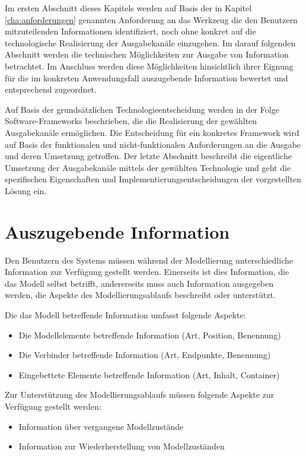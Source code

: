 Im ersten Abschnitt dieses Kapitels werden auf Basis der in Kapitel \ref{cha:anforderungen} genannten Anforderung an das Werkzeug die den Benutzern mitzuteilenden Informationen identifiziert, noch ohne konkret auf die technologische Realisierung der Ausgabekanäle einzugehen. Im darauf folgenden Abschnitt werden die technischen Möglichkeiten zur Ausgabe von Information betrachtet. Im Anschluss werden diese Möglichkeiten hinsichtlich ihrer Eignung für die im konkreten Anwendungsfall auszugebende Information bewertet und entsprechend zugeordnet.

Auf Basis der grundsätzlichen Technologieentscheidung werden in der Folge Software-Frameworks beschrieben, die die Realisierung der gewählten Ausgabekanäle ermöglichen. Die Entscheidung für ein konkretes Framework wird auf Basis der funktionalen und nicht-funktionalen Anforderungen an die Ausgabe und deren Umsetzung getroffen. Der letzte Abschnitt beschreibt die eigentliche Umsetzung der Ausgabekanäle mittels der gewählten Technologie und geht die spezifischen Eigenschaften und Implementierungsentscheidungen der vorgestellten Lösung ein.

\section{Auszugebende Information} %
\label{sec:auszugebende_information}

Den Benutzern des Systems müssen während der Modellierung unterschiedliche Information zur Verfügung gestellt werden. Einerseits ist dies Information, die das Modell selbst betrifft, andererseits muss auch Information ausgegeben werden, die Aspekte des Modellierungsablaufs beschreibt oder unterstützt.

Die das Modell betreffende Information umfasst folgende Aspekte:
\begin{itemize}
 \item Die Modellelemente betreffende Information (Art, Position, Benennung)
 \item Die Verbinder betreffende Information (Art, Endpunkte, Benennung)
 \item Eingebettete Elemente betreffende Information (Art, Inhalt, Container)
\end{itemize}

Zur Unterstützung des Modellierungsablaufs müssen folgende Aspekte zur Verfügung gestellt werden:
\begin{itemize}
 \item Information über vergangene Modellzustände
 \item Information zur Wiederherstellung von Modellzuständen
\end{itemize}


